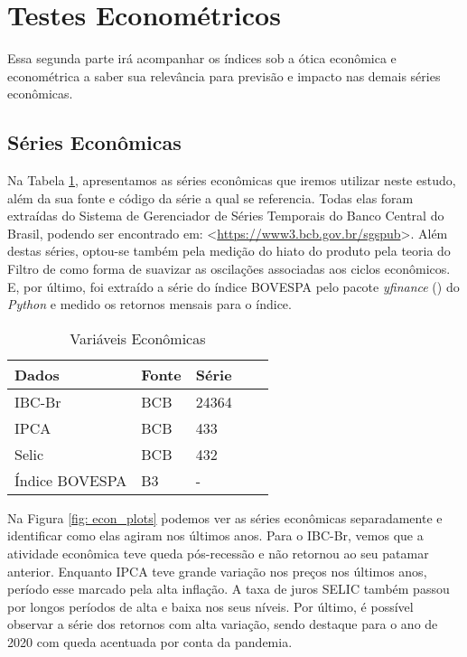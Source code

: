 

\section{Testes Econométricos}

Essa segunda parte irá acompanhar os índices sob a ótica econômica e econométrica a saber sua relevância para previsão e impacto nas demais séries econômicas.

\subsection{Séries Econômicas}

Na Tabela \ref{tab: variaveis}, apresentamos as séries econômicas que iremos utilizar neste estudo, além da sua fonte e código da série a qual se referencia. Todas elas foram extraídas do Sistema de Gerenciador de Séries Temporais do Banco Central do Brasil, podendo ser encontrado em: <\url{https://www3.bcb.gov.br/sgspub}>. Além destas séries, optou-se também pela medição do hiato do produto pela teoria do Filtro de  como forma de suavizar as oscilações associadas aos ciclos econômicos. E, por último, foi extraído a série do índice BOVESPA pelo pacote \textit{yfinance} () do \textit{Python} e medido os retornos mensais para o índice.

\begin{table}[!h]
\caption{Variáveis Econômicas}
\centering
\begin{tabular}{llllc}
\hline
Dados  & Fonte & Série \\
\hline
IBC-Br & BCB   & 24364 \\
IPCA   & BCB   & 433   \\
Selic  & BCB   & 432   \\
Índice BOVESPA & B3 & -\\
\hline
\end{tabular} \label{tab: variaveis}
\end{table}

Na Figura \ref{fig: econ_plots} podemos ver as séries econômicas separadamente e identificar como elas agiram nos últimos anos. Para o IBC-Br, vemos que a atividade econômica teve queda pós-recessão e não retornou ao seu patamar anterior. Enquanto IPCA teve grande variação nos preços nos últimos anos, período esse marcado pela alta inflação. A taxa de juros SELIC também passou por longos períodos de alta e baixa nos seus níveis. Por último, é possível observar a série dos retornos com alta variação, sendo destaque para o ano de 2020 com queda acentuada por conta da pandemia.

